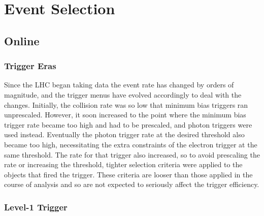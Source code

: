 \chapter{Event Selection}
\section{Online}
\subsection{Trigger Eras}
Since the LHC began taking data the event rate has changed by orders of magnitude,  
and the trigger menus have evolved accordingly to deal with the changes.  
Initially, the collision rate was so low that minimum bias triggers ran unprescaled.  
However, it soon increased to the point where the minimum bias trigger rate became too high
and had to be prescaled, and photon triggers were used instead.  
Eventually the photon trigger rate at the desired threshold also became too high,
necessitating the extra constraints of the electron trigger at the same threshold.  
The rate for that trigger also increased, so to avoid prescaling the rate or increasing the threshold,
tighter selection criteria were applied to the objects that fired the trigger.  
These criteria are looser than those applied in the course of analysis and so are not expected
to seriously affect the trigger efficiency.  



\subsection{Level-1 Trigger}


